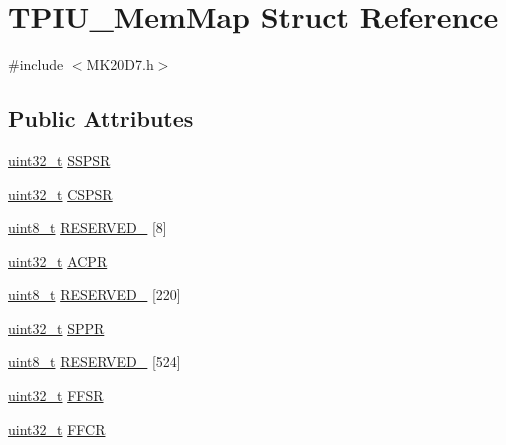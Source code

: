 \hypertarget{struct_t_p_i_u___mem_map}{}\section{T\+P\+I\+U\+\_\+\+Mem\+Map Struct Reference}
\label{struct_t_p_i_u___mem_map}


{\ttfamily \#include $<$M\+K20\+D7.\+h$>$}

\subsection*{Public Attributes}
\begin{DoxyCompactItemize}
\item 
\hyperlink{_p_e___types_8h_a33594304e786b158f3fb30289278f5af}{uint32\+\_\+t} \hyperlink{struct_t_p_i_u___mem_map_a3570cf26e2ddc1d5700776743b0506e3}{S\+S\+P\+SR}
\item 
\hyperlink{_p_e___types_8h_a33594304e786b158f3fb30289278f5af}{uint32\+\_\+t} \hyperlink{struct_t_p_i_u___mem_map_a9f8c3b9dcdcb9d2677b661fe2f8a5489}{C\+S\+P\+SR}
\item 
\hyperlink{_p_e___types_8h_aba7bc1797add20fe3efdf37ced1182c5}{uint8\+\_\+t} \hyperlink{struct_t_p_i_u___mem_map_a736515788258b38e92719f5946ab480d}{R\+E\+S\+E\+R\+V\+E\+D\+\_} \mbox{[}8\mbox{]}
\item 
\hyperlink{_p_e___types_8h_a33594304e786b158f3fb30289278f5af}{uint32\+\_\+t} \hyperlink{struct_t_p_i_u___mem_map_a007e503f472f605b40c6f7425e4bdf77}{A\+C\+PR}
\item 
\hyperlink{_p_e___types_8h_aba7bc1797add20fe3efdf37ced1182c5}{uint8\+\_\+t} \hyperlink{struct_t_p_i_u___mem_map_ae98672c65f4d6dc30102fee6b0fd5b8d}{R\+E\+S\+E\+R\+V\+E\+D\+\_} \mbox{[}220\mbox{]}
\item 
\hyperlink{_p_e___types_8h_a33594304e786b158f3fb30289278f5af}{uint32\+\_\+t} \hyperlink{struct_t_p_i_u___mem_map_a1b821d4f74563499ff569877ae672742}{S\+P\+PR}
\item 
\hyperlink{_p_e___types_8h_aba7bc1797add20fe3efdf37ced1182c5}{uint8\+\_\+t} \hyperlink{struct_t_p_i_u___mem_map_a3b780e7b4afd91566df4bf0a852eae70}{R\+E\+S\+E\+R\+V\+E\+D\+\_} \mbox{[}524\mbox{]}
\item 
\hyperlink{_p_e___types_8h_a33594304e786b158f3fb30289278f5af}{uint32\+\_\+t} \hyperlink{struct_t_p_i_u___mem_map_ada0d6c32bb6a91e5edfcbbe7f37e6fd6}{F\+F\+SR}
\item 
\hyperlink{_p_e___types_8h_a33594304e786b158f3fb30289278f5af}{uint32\+\_\+t} \hyperlink{struct_t_p_i_u___mem_map_a34d81bddad51a7dcdbf76548b3809d82}{F\+F\+CR}

\end{DoxyCompactItemize}
